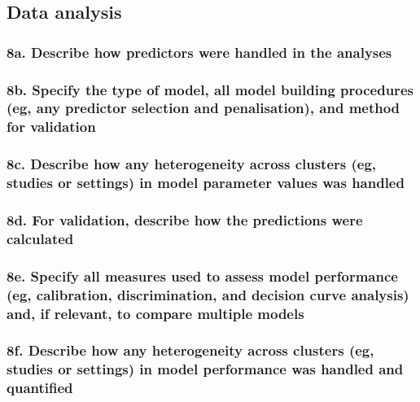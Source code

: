 \documentclass[
  letterpaper,
  DIV=11,
  numbers=noendperiod]{scrartcl}
\begin{document}
\subsection{Data analysis}\label{data-analysis}

\subsubsection{8a. Describe how predictors were handled in the
analyses}\label{a.-describe-how-predictors-were-handled-in-the-analyses}

\subsubsection{8b. Specify the type of model, all model building
procedures (eg, any predictor selection and penalisation), and method
for
validation}\label{b.-specify-the-type-of-model-all-model-building-procedures-eg-any-predictor-selection-and-penalisation-and-method-for-validation}

\subsubsection{8c. Describe how any heterogeneity across clusters (eg,
studies or settings) in model parameter values was
handled}\label{c.-describe-how-any-heterogeneity-across-clusters-eg-studies-or-settings-in-model-parameter-values-was-handled}

\subsubsection{8d. For validation, describe how the predictions were
calculated}\label{d.-for-validation-describe-how-the-predictions-were-calculated}

\subsubsection{8e. Specify all measures used to assess model performance
(eg, calibration, discrimination, and decision curve analysis) and, if
relevant, to compare multiple
models}\label{e.-specify-all-measures-used-to-assess-model-performance-eg-calibration-discrimination-and-decision-curve-analysis-and-if-relevant-to-compare-multiple-models}

\subsubsection{8f. Describe how any heterogeneity across clusters (eg,
studies or settings) in model performance was handled and
quantified}\label{f.-describe-how-any-heterogeneity-across-clusters-eg-studies-or-settings-in-model-performance-was-handled-and-quantified}
\end{document}

